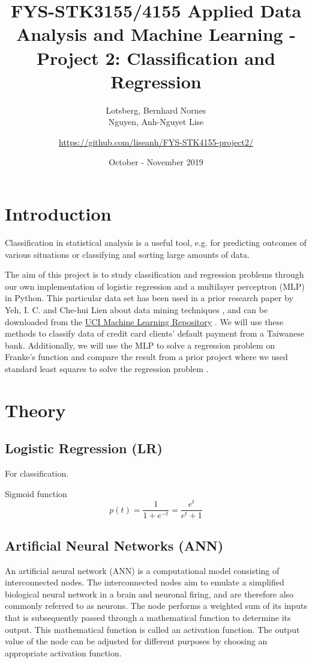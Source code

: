 \documentclass[a4paper, 11pt, twocolumn]{article}
\title{FYS-STK3155/4155 Applied Data Analysis and Machine Learning - Project 2: Classification and Regression }
\author{Lotsberg, Bernhard Nornes \\ Nguyen, Anh-Nguyet Lise \and \url{https://github.com/liseanh/FYS-STK4155-project2/}}
\date{October - November 2019}
\begin{document}

\section{Introduction}
Classification in statistical analysis is a useful tool, e.g. for predicting outcomes of various situations or classifying and sorting large amounts of data.

The aim of this project is  to study classification and regression problems through our own implementation of logistic regression and a multilayer perceptron (MLP) in Python. This particular data set has been used in a prior research paper by Yeh, I. C. and Che-hui Lien about data mining techniques \cite{origarticle}, and can be downloaded from the \href{https://archive.ics.uci.edu/ml/datasets/default+of+credit+card+clients}{UCI Machine Learning Repository} \cite{UCI}.
We will use these methods to classify data of credit card clients' default payment from a Taiwanese bank. Additionally, we will use the MLP to solve a regression problem on Franke's function and compare the result from a prior project where we used standard least squares to solve the regression problem \cite{regpaper}.


\section{Theory}

\subsection{Logistic Regression (LR)}
For classification.

Sigmoid function
\begin{equation}
p(t) = \frac{1}{1 + e^{-t}} =\frac{e^t}{e^t+1}
\end{equation}

\subsection{Artificial Neural Networks (ANN)}
An artificial neural network (ANN) is a computational model consisting of interconnected nodes. The interconnected nodes aim to emulate a simplified biological neural network in a brain  and neuronal firing, and are therefore also commonly referred to as neurons.  The node performs a weighted sum of its inputs that is subsequently passed through a mathematical function to determine its output. This mathematical function is called an activation function. The output value of the node can be adjusted for different purposes by choosing an appropriate activation function.
\end{document}
